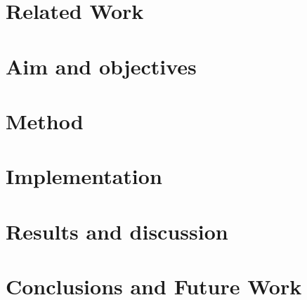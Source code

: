 \documentclass[a4paper,oneside]{bth}
\begin{document}
\chapter{Related Work}


\chapter{Aim and objectives}



\chapter{Method}


\chapter{Implementation}


\chapter{Results and discussion}


\chapter{Conclusions and Future Work}



\nocite{*}

\end{document}
